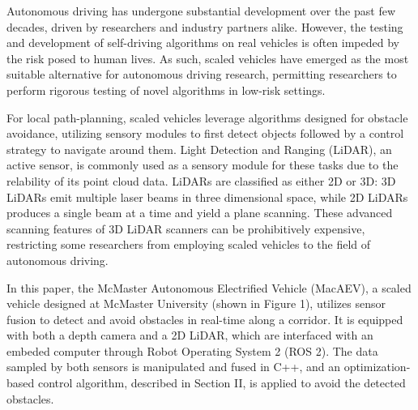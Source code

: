 \documentclass[conference]{IEEEtran}
\begin{document}




Autonomous driving has undergone substantial development over the past few decades, driven by researchers and industry partners alike. However, the testing and development of self-driving algorithms on real vehicles is often impeded by the risk posed to human lives. As such, scaled vehicles have emerged as the most suitable alternative for autonomous driving research, permitting researchers to perform rigorous testing of novel algorithms in low-risk settings. 


For local path-planning, scaled vehicles leverage algorithms designed for obstacle avoidance, utilizing sensory modules to first detect objects followed by a control strategy to navigate around them. Light Detection and Ranging (LiDAR), an active sensor, is commonly used as a sensory module for these tasks due to the relability of its point cloud data. LiDARs are classified as either 2D or 3D: 3D LiDARs emit multiple laser beams in three dimensional space, while 2D LiDARs produces a single beam at a time and yield a plane scanning. These advanced scanning features of 3D LiDAR scanners can be prohibitively expensive, restricting some researchers from employing scaled vehicles to the field of autonomous driving.

In this paper, the McMaster Autonomous Electrified Vehicle (MacAEV), a scaled vehicle designed at McMaster University (shown in Figure 1), utilizes sensor fusion to detect and avoid obstacles in real-time along a corridor. It is equipped with both a depth camera and a 2D LiDAR, which are interfaced with an embeded computer through Robot Operating System 2 (ROS 2). The data sampled by both sensors is manipulated and fused in C++, and an optimization-based control algorithm, described in Section II, is applied to avoid the detected obstacles. 
\end{document}
